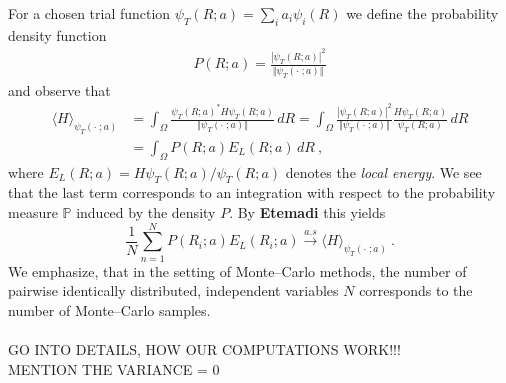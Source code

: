 \documentclass[11pt,a4paper]{article}
\numberwithin{equation}{section}
\begin{document}
For a chosen trial function $\psi_T(R;a)=\sum_{i}a_i\psi_i(R)$ we define the probability density function 
\begin{align*}
P(R;a) = \frac{|\psi_T(R;a)|^2}{\Vert \psi_T(\cdot\;;a)\Vert}
\end{align*} 
and observe that 
\begin{align*}
\langle H \rangle_{\psi_T(\cdot\;;a)} 
&= \int_{\Omega}\frac{\psi_T(R;a)^*H\psi_T(R;a)}{\Vert \psi_T(\cdot\;;a)\Vert}\,dR
=\int_{\Omega} \frac{|\psi_T(R;a)|^2}{\Vert \psi_T(\cdot\;;a)\Vert}\frac{H\psi_T(R;a)}{\psi_T(R;a)}\,dR\\
&=\int_{\Omega} P(R;a)E_L(R;a)\,dR~,
\end{align*}
where $E_L(R;a) = H\psi_T(R;a)/\psi_T(R;a)$ denotes the {\it local energy}. 
%
We see that the last term corresponds to an integration with respect to the probability measure $\mathbb{P}$ induced by the density $P$.
%
By \textbf{Etemadi} this yields
\begin{equation}
\label{eq:StrongLawofBN}
\frac{1}{N}\sum_{n=1}^NP(R_i;a)E_L(R_i;a)\overset{a.s}{\longrightarrow}\langle H \rangle_{\psi_T(\cdot\;;a)}~.
\end{equation}
We emphasize, that in the setting of Monte--Carlo methods, the number of pairwise identically distributed, independent variables $N$ corresponds to the number of  Monte--Carlo samples.\\
\\
GO INTO DETAILS, HOW OUR COMPUTATIONS WORK!!!\\
MENTION THE VARIANCE = 0\\
\\
\end{document}
